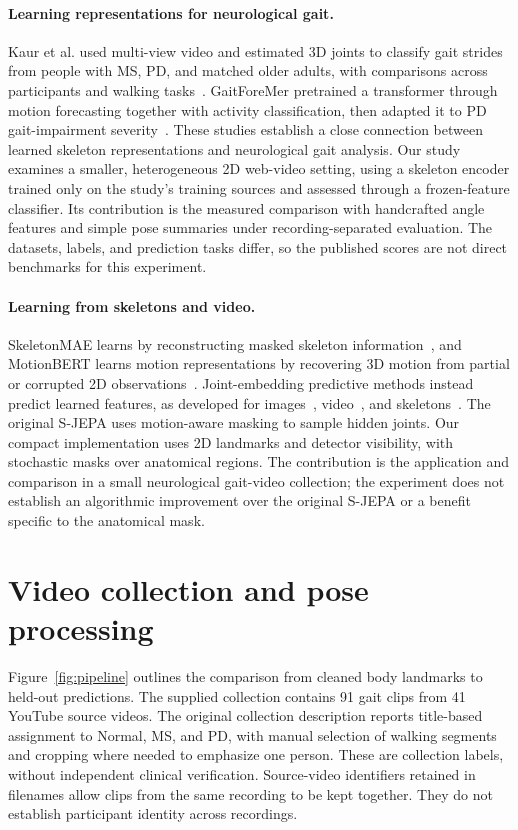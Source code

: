 \documentclass[10pt,twocolumn,letterpaper]{article}
\begin{document}
\paragraph{Learning representations for neurological gait.}
Kaur et al. used multi-view video and estimated 3D joints to classify gait strides from people with MS, PD, and matched older adults, with comparisons across participants and walking tasks~\cite{kaur2023}. GaitForeMer pretrained a transformer through motion forecasting together with activity classification, then adapted it to PD gait-impairment severity~\cite{gaitforemer}. These studies establish a close connection between learned skeleton representations and neurological gait analysis. Our study examines a smaller, heterogeneous 2D web-video setting, using a skeleton encoder trained only on the study's training sources and assessed through a frozen-feature classifier. Its contribution is the measured comparison with handcrafted angle features and simple pose summaries under recording-separated evaluation. The datasets, labels, and prediction tasks differ, so the published scores are not direct benchmarks for this experiment.

\paragraph{Learning from skeletons and video.}
SkeletonMAE learns by reconstructing masked skeleton information~\cite{skeletonmae}, and MotionBERT learns motion representations by recovering 3D motion from partial or corrupted 2D observations~\cite{motionbert}. Joint-embedding predictive methods instead predict learned features, as developed for images~\cite{ijepa}, video~\cite{vjepa}, and skeletons~\cite{sjepa}. The original S-JEPA uses motion-aware masking to sample hidden joints. Our compact implementation uses 2D landmarks and detector visibility, with stochastic masks over anatomical regions. The contribution is the application and comparison in a small neurological gait-video collection; the experiment does not establish an algorithmic improvement over the original S-JEPA or a benefit specific to the anatomical mask.



\section{Video collection and pose processing}
Figure~\ref{fig:pipeline} outlines the comparison from cleaned body landmarks to held-out predictions.
The supplied collection contains 91 gait clips from 41 YouTube source videos. The original collection description reports title-based assignment to Normal, MS, and PD, with manual selection of walking segments and cropping where needed to emphasize one person. These are collection labels, without independent clinical verification. Source-video identifiers retained in filenames allow clips from the same recording to be kept together. They do not establish participant identity across recordings.
\end{document}
